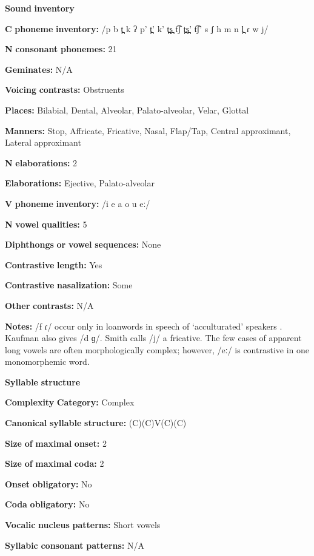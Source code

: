 \begin{styleBody}
\textbf{Sound} \textbf{inventory}

\textbf{C} \textbf{phoneme} \textbf{inventory:} /p b t̪ k ʔ p’ t̪’ k’ t̪s̪ t͡ʃ t̪s̪’ t͡ʃ’ s ʃ h m n l̪ ɾ w j/

\textbf{N} \textbf{consonant} \textbf{phonemes:} 21

\textbf{Geminates:} N/A

\textbf{Voicing} \textbf{contrasts:} Obstruents

\textbf{Places:} Bilabial, Dental, Alveolar, Palato-alveolar, Velar, Glottal

\textbf{Manners:} Stop, Affricate, Fricative, Nasal, Flap/Tap, Central approximant, Lateral approximant

\textbf{N} \textbf{elaborations:} 2

\textbf{Elaborations:} Ejective, Palato-alveolar

\textbf{V} \textbf{phoneme} \textbf{inventory:} /i e a o u eː/

\textbf{N} \textbf{vowel} \textbf{qualities:} 5

\textbf{Diphthongs} \textbf{or} \textbf{vowel} \textbf{sequences:} None

\textbf{Contrastive} \textbf{length:} Yes

\textbf{Contrastive} \textbf{nasalization:} Some

\textbf{Other} \textbf{contrasts:} N/A

\textbf{Notes:} /f ɾ/ occur only in loanwords in speech of ‘acculturated’ speakers \citep[13]{Kaufman1971}. Kaufman also gives /d ɡ/. Smith calls /j/ a fricative. The few cases of apparent long vowels are often morphologically complex; however, /eː/ is contrastive in one monomorphemic word.

\textbf{Syllable} \textbf{structure}

\textbf{Complexity} \textbf{Category:} Complex

\textbf{Canonical} \textbf{syllable} \textbf{structure:} (C)(C)V(C)(C) \citep[9-15]{Kaufman1971}

\textbf{Size} \textbf{of} \textbf{maximal} \textbf{onset:} 2

\textbf{Size} \textbf{of} \textbf{maximal} \textbf{coda:} 2

\textbf{Onset} \textbf{obligatory:} No

\textbf{Coda} \textbf{obligatory:} No

\textbf{Vocalic} \textbf{nucleus} \textbf{patterns:} Short vowels

\textbf{Syllabic} \textbf{consonant} \textbf{patterns:} N/A


\end{styleBody}
